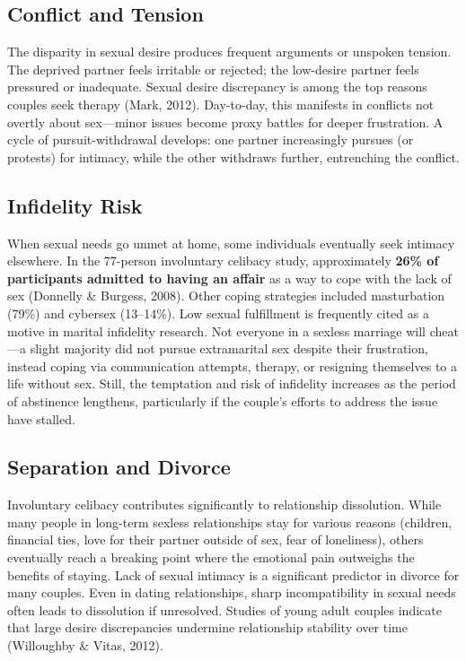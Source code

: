\documentclass[12pt,openany]{book}
\numberwithin{equation}{chapter}
\begin{document}
\subsection{Conflict and Tension}

The disparity in sexual desire produces frequent arguments or unspoken tension. The deprived partner feels irritable or rejected; the low-desire partner feels pressured or inadequate. Sexual desire discrepancy is among the top reasons couples seek therapy (Mark, 2012). Day-to-day, this manifests in conflicts not overtly about sex---minor issues become proxy battles for deeper frustration. A cycle of pursuit-withdrawal develops: one partner increasingly pursues (or protests) for intimacy, while the other withdraws further, entrenching the conflict.

\subsection{Infidelity Risk}

When sexual needs go unmet at home, some individuals eventually seek intimacy elsewhere. In the 77-person involuntary celibacy study, approximately \textbf{26\% of participants admitted to having an affair} as a way to cope with the lack of sex (Donnelly \& Burgess, 2008). Other coping strategies included masturbation (79\%) and cybersex (13--14\%). Low sexual fulfillment is frequently cited as a motive in marital infidelity research. Not everyone in a sexless marriage will cheat---a slight majority did not pursue extramarital sex despite their frustration, instead coping via communication attempts, therapy, or resigning themselves to a life without sex. Still, the temptation and risk of infidelity increases as the period of abstinence lengthens, particularly if the couple's efforts to address the issue have stalled.

\subsection{Separation and Divorce}

Involuntary celibacy contributes significantly to relationship dissolution. While many people in long-term sexless relationships stay for various reasons (children, financial ties, love for their partner outside of sex, fear of loneliness), others eventually reach a breaking point where the emotional pain outweighs the benefits of staying. Lack of sexual intimacy is a significant predictor in divorce for many couples. Even in dating relationships, sharp incompatibility in sexual needs often leads to dissolution if unresolved. Studies of young adult couples indicate that large desire discrepancies undermine relationship stability over time (Willoughby \& Vitas, 2012).
\end{document}
